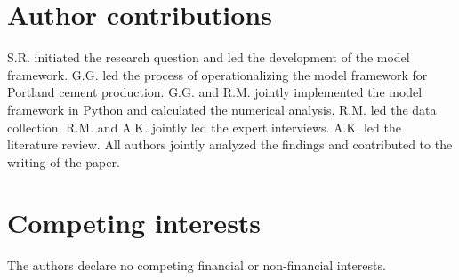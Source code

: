 \documentclass[12pt, a4paper]{article} %
\newcommand{\Suppl}{Supplemental}
\begin{document}
\section*{Author contributions}
S.R. initiated the research question and led the development of the model framework. G.G. led the process of operationalizing the model framework for Portland cement production. G.G. and R.M. jointly implemented the model framework in Python and calculated the numerical analysis. R.M. led the data collection. R.M. and A.K. jointly led the expert interviews. A.K. led the literature review. All authors jointly analyzed the findings and contributed to the writing of the paper.

\section*{Competing interests}
The authors declare no competing financial or non-financial interests.

\newpage
\appendix
\renewcommand{\thefootnote}{\arabic{footnote}}
\renewcommand{\figurename}{\Suppl$ $ Figure}
\renewcommand{\tablename}{\Suppl$ $ Table}
\renewcommand{\refname}{\Suppl$ $ References}
\renewcommand{\thesubsection}{\Suppl$ $ Note \arabic{subsection}}
\setcounter{footnote}{0}
\setcounter{section}{0}
\setcounter{figure}{0}
\setcounter{table}{0}

\end{document}
